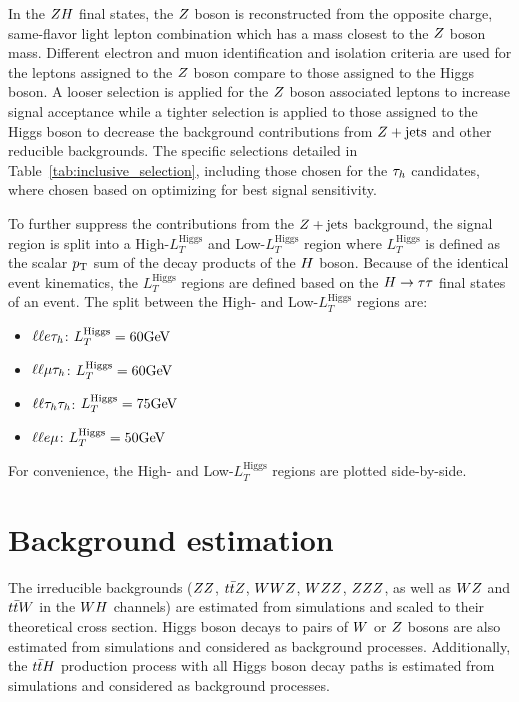 In the $ZH$ final states, the $Z$ boson is reconstructed from the opposite charge, same-flavor
light lepton combination which has a mass closest to the $Z$ boson mass. Different 
electron and muon identification and isolation criteria are used for the leptons 
assigned to the $Z$ boson compare to those assigned to the Higgs boson. A looser
selection is applied for the $Z$ boson associated leptons to increase signal acceptance
while a tighter selection is applied to those assigned to the Higgs boson to
decrease the background contributions from $Z+\textrm{jets}$ and other reducible
backgrounds. The specific selections detailed in Table~\ref{tab:inclusive_selection},
including those chosen for the $\tau_{h}$ candidates, where chosen based on 
optimizing for best signal sensitivity.

To further suppress the contributions from the $Z+\textrm{jets}$ background, the signal 
region is split into a High-$L_{T}^{\textrm{Higgs}}$ and Low-$L_{T}^{\textrm{Higgs}}$
region where $L_{T}^{\textrm{Higgs}}$ is defined as the scalar $p_\mathrm{T}$ sum of the decay 
products of the $H$ boson. Because of the identical event kinematics, the 
$L_{T}^{\textrm{Higgs}}$ regions are defined based on the $H\to\tau\tau$ final 
states of an event. The split between the High- and Low-$L_{T}^{\textrm{Higgs}}$
regions are:
\begin{itemize}
\item $\ell\ell e\tau_{h}$: $L_{T}^{\textrm{Higgs}} = 60\mathrm{GeV}$
\item $\ell\ell\mu\tau_{h}$: $L_{T}^{\textrm{Higgs}} = 60\mathrm{GeV}$
\item $\ell\ell\tau_{h}\tau_{h}$: $L_{T}^{\textrm{Higgs}} = 75\mathrm{GeV}$
\item $\ell\ell e\mu$: $L_{T}^{\textrm{Higgs}} = 50\mathrm{GeV}$
\end{itemize}
For convenience, the High- and Low-$L_{T}^{\textrm{Higgs}}$ regions are plotted
side-by-side.



\section{Background estimation}
\label{sec:background_estimation}

The irreducible backgrounds ($ZZ$, $t\bar{t}Z$, $WWZ$, $WZZ$, 
$ZZZ$, as well as $WZ$ and $t\bar{t} W$ in the $WH$ channels) are 
estimated from simulations and scaled to their theoretical cross section. Higgs 
boson decays to pairs of $W$ or $Z$ bosons 
are also estimated from simulations and considered as background processes. 
Additionally, the $t\bar{t}H$ production process with all Higgs boson decay
paths is estimated from simulations and considered as background processes.

